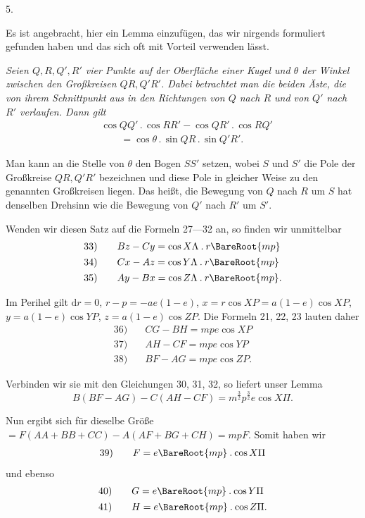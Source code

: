 \par{}\bigskip
{}
\begin{center}5.\end{center}
\noindent\hspace*{\parindent}Es ist angebracht, hier ein Lemma einzufügen, das wir nirgends formuliert gefunden haben und das sich oft mit Vorteil verwenden lässt.
\par\textit{Seien \(Q,R,Q',R'\) vier Punkte auf der Oberfläche einer Kugel und \(\theta\) der Winkel zwischen den Großkreisen \(QR,Q'R'\). Dabei betrachtet man die beiden Äste, die von ihrem Schnittpunkt aus in den Richtungen von \(Q\) nach \(R\) und von \(Q'\) nach \(R'\) verlaufen. Dann gilt}
\[
\begin{aligned}
&\cos QQ'\mathbin{.}\cos RR'-\cos QR'\mathbin{.}\cos RQ'\\
&\qquad=\cos\theta\mathbin{.}\sin QR\mathbin{.}\sin Q'R'.
\end{aligned}
\]
\par Man kann an die Stelle von \(\theta\) den Bogen \(SS'\) setzen, wobei \(S\) und \(S'\) die Pole der Großkreise \(QR,Q'R'\) bezeichnen und diese Pole in gleicher Weise zu den genannten Großkreisen liegen. Das heißt, die Bewegung von \(Q\) nach \(R\) um \(S\) hat denselben Drehsinn wie die Bewegung von \(Q'\) nach \(R'\) um \(S'\).
\par Wenden wir diesen Satz auf die Formeln 27—32 an, so finden wir unmittelbar
\[
\begin{array}{rl}
33)\quad&Bz-Cy=\cos X\Lambda\mathbin{.}r\BareRoot{mp}\\[4pt]
34)\quad&Cx-Az=\cos Y\Lambda\mathbin{.}r\BareRoot{mp}\\[4pt]
35)\quad&Ay-Bx=\cos Z\Lambda\mathbin{.}r\BareRoot{mp}.
\end{array}
\]
\par Im Perihel gilt \(\mathrm{d}r=0\), \(r-p=-ae(1-e)\), \(x=r\cos XP=a(1-e)\cos XP\), \(y=a(1-e)\cos YP\), \(z=a(1-e)\cos ZP\). Die Formeln 21, 22, 23 lauten daher
\[
\begin{array}{rl}
36)\quad&CG-BH=mpe\cos XP\\[4pt]
37)\quad&AH-CF=mpe\cos YP\\[4pt]
38)\quad&BF-AG=mpe\cos ZP.
\end{array}
\]
\par Verbinden wir sie mit den Gleichungen 30, 31, 32, so liefert unser Lemma
\[
B(BF-AG)-C(AH-CF)=m^{\frac32}p^{\frac32}e\cos X\Pi.
\]
\par Nun ergibt sich für dieselbe Größe \(=F(AA+BB+CC)-A(AF+BG+CH)=mpF\). Somit haben wir
\[
\begin{array}{rl}39)\quad&F=e\BareRoot{mp}\mathbin{.}\cos X\Pi\end{array}
\]
und ebenso
\[
\begin{array}{rl}
40)\quad&G=e\BareRoot{mp}\mathbin{.}\cos Y\Pi\\[4pt]
41)\quad&H=e\BareRoot{mp}\mathbin{.}\cos Z\Pi.
\end{array}
\]
